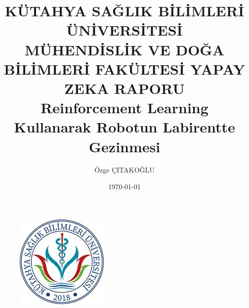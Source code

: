\documentclass[12pt, a4paper]{article}
\title{\bf\fontsize{12pt}{14pt}\selectfont KÜTAHYA SAĞLIK BİLİMLERİ ÜNİVERSİTESİ\\MÜHENDİSLİK VE DOĞA BİLİMLERİ FAKÜLTESİ }
\begin{document}
	\maketitle
	\begin{figure}[h]
		\centering
		\includegraphics{logo}\\ \
		
		 \author{Özge ÇITAKOĞLU} \\
		\date{\today} 
	\end{figure}  
	\begin{center}
		\title{\bf\fontsize{12pt}{14pt}\selectfont YAPAY ZEKA RAPORU \\
			Reinforcement Learning Kullanarak Robotun Labirentte Gezinmesi  }
	\end{center}
	\newpage
		
	
\end{document}
